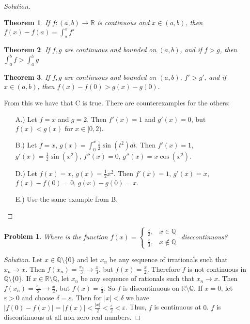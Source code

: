 \documentclass[oneside]{book}
\theoremstyle{mystyle}
\newtheorem{problem}{Problem}[section]
\newtheorem*{theorem*}{Theorem}
\begin{document}
\begin{proof}[Solution]
\begin{theorem*}
If $f:(a,b)\rightarrow \mathbb{R}$ is continuous and $x\in (a,b)$, then $f(x)-f(a) = \int_{a}^{x}f'$ 
\end{theorem*}
\begin{theorem*}
If $f,g$ are continuous and bounded on $(a,b)$, and if $f>g$, then $\int_{a}^{b}f > \int_{a}^{b}g$
\end{theorem*}
\begin{theorem*}
If $f,g$ are continuous and bounded on $(a,b)$, $f'>g'$, and if $x\in (a,b)$, then $f(x) - f(0) > g(x) - g(0)$.
\end{theorem*}
From this we have that C is true. There are counterexamples for the others:
\begin{enumerate}
    \item[A.)] Let $f = x$ and $g = 2$. Then $f'(x) = 1$ and $g'(x) = 0$, but $f(x)<g(x)$ for $x\in [0,2)$.
    \item[B.)] Let $f = x$, $g(x) = \int_{0}^{x} \frac{1}{2}\sin(t^2)dt$. Then $f'(x) = 1$, $g'(x) = \frac{1}{2}\sin(x^2)$, $f''(x) = 0$, $g''(x) = x\cos(x^2)$.
    \item[D.)] Let $f(x) = x$, $g(x) = \frac{1}{2}x^2$. Then $f'(x) = 1$, $g'(x) = x$, $f(x)-f(0) = 0$, $g(x)-g(0) = x$.
    \item[E.)] Use the same example from B.
\end{enumerate}
\end{proof}
\begin{problem}
Where is the function $f(x) = \begin{cases} \frac{x}{2}, & x\in \mathbb{Q} \\ \frac{x}{3}, & x \notin \mathbb{Q}\end{cases}$ disccontinuous?
\end{problem}
\begin{proof}[Solution]
Let $x\in \mathbb{Q}\setminus \{0\}$ and let $x_n$ be any sequence of irrationals such that $x_n \rightarrow x$. Then $f(x_n) = \frac{x_n}{3} \rightarrow \frac{x}{3}$, but $f(x) = \frac{x}{2}$. Therefore $f$ is not continuous in $\mathbb{Q}\setminus \{0\}$. If $x\in \mathbb{R}\setminus \mathbb{Q}$, let $x_n$ be any sequence of rationals such that $x_n \rightarrow x$. Then $f(x_n) = \frac{x_n}{2} \rightarrow \frac{x}{2}$, but $f(x) = \frac{x}{3}$. So $f$ is discontinuous on $\mathbb{R}\setminus \mathbb{Q}$. If $x= 0$, let $\varepsilon>0$ and choose $\delta = \varepsilon$. Then for $|x|<\delta$ we have $|f(0) - f(x)| = |f(x)| < \frac{|x|}{2} < \frac{\varepsilon}{2}<\varepsilon$. Thus, $f$ is continuous at $0$. $f$ is discontinuous at all non-zero real numbers.
\end{proof}
\end{document}
